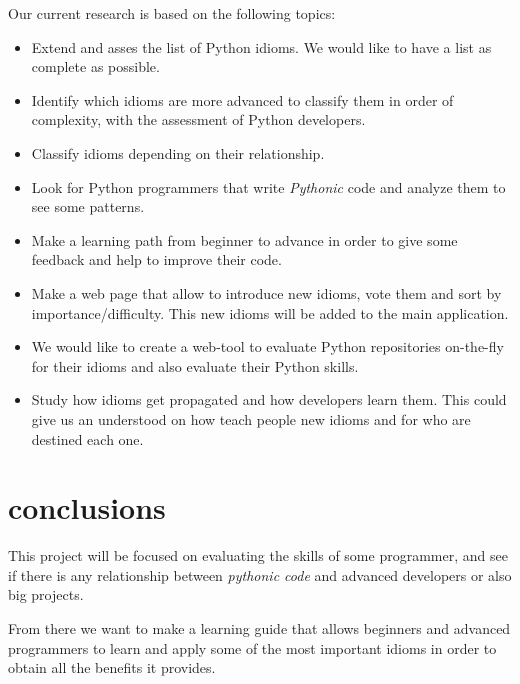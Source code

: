 \documentclass[conference]{IEEEtran}
\begin{document}
Our current research is based on the following topics:
\begin{itemize}
    \item Extend and asses the list of Python idioms. We would like to have a list as complete as possible.
    \item Identify which idioms are more advanced to classify them in order of complexity, with the assessment of Python developers.
    \item Classify idioms depending on their relationship.
    \item Look for Python programmers that write \emph{Pythonic} code and analyze them to see some patterns.
    \item Make a learning path from beginner to advance in order to give some feedback and help to improve their code.
    \item Make a web page that allow to introduce new idioms, vote them and sort by importance/difficulty. This new idioms will be added to the main application.
    \item We would like to create a web-tool to evaluate Python repositories on-the-fly for their idioms and also evaluate their Python skills.
    \item Study how idioms get propagated and how developers learn them. This could give us an understood on how teach people new idioms and for who are destined each one.
\end{itemize}

\section{conclusions}
This project will be focused on evaluating the skills of some programmer, and see if there is any relationship between \textit{pythonic code} and advanced developers or also big projects.

From there we want to make a learning guide that allows beginners and advanced programmers to learn and apply some of the most important idioms in order to obtain all the benefits it provides.
\end{document}
